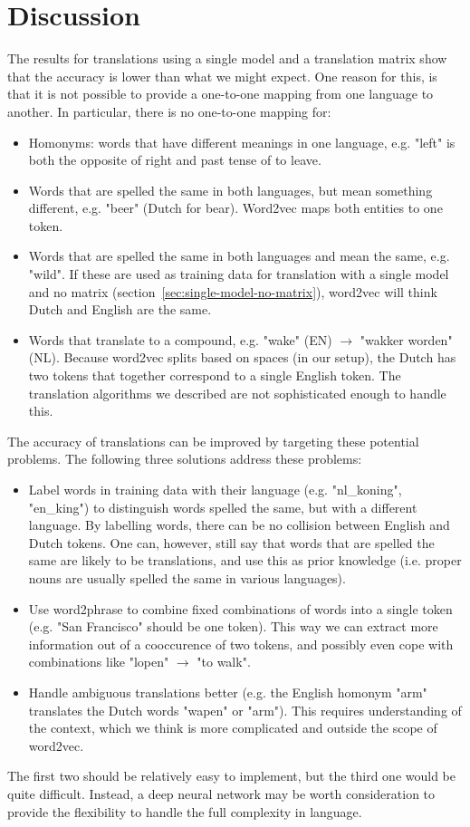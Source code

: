 \section{Discussion}
\label{sec:discussion}
The results for translations using a single model and a translation matrix show that the accuracy is lower than what we might expect. One reason for this, is that it is not possible to provide a one-to-one mapping from one language to another. In particular, there is no one-to-one mapping for:
\begin{itemize}
\item Homonyms: words that have different meanings in one language, e.g. "left" is both the opposite of right and past tense of to leave.
\item Words that are spelled the same in both languages, but mean something different, e.g. "beer" (Dutch for bear). Word2vec maps both entities to one token.
\item Words that are spelled the same in both languages and mean the same, e.g. "wild". If these are used as training data for translation with a single model and no matrix (section~\ref{sec:single-model-no-matrix}), word2vec will think Dutch and English are the same.
\item Words that translate to a compound, e.g. "wake" (EN) $\to$ "wakker worden" (NL). Because word2vec splits based on spaces (in our setup), the Dutch has two tokens that together correspond to a single English token. The translation algorithms we described are not sophisticated enough to handle this.
\end{itemize}

The accuracy of translations can be improved by targeting these potential problems. The following three solutions address these problems:

\begin{itemize}
\item Label words in training data with their language (e.g. "nl\_koning", "en\_king") to distinguish words spelled the same, but with a different language. By labelling words, there can be no collision between English and Dutch tokens. One can, however, still say that words that are spelled the same are likely to be translations, and use this as prior knowledge (i.e. proper nouns are usually spelled the same in various languages).
\item Use word2phrase to combine fixed combinations of words into a single token (e.g. "San Francisco" should be one token). This way we can extract more information out of a cooccurence of two tokens, and possibly even cope with combinations like "lopen" $\to$ "to walk".
\item Handle ambiguous translations better (e.g. the English homonym "arm" translates the Dutch words "wapen" or "arm"). This requires understanding of the context, which we think is more complicated and outside the scope of word2vec.
\end{itemize}

The first two should be relatively easy to implement, but the third one would be quite difficult. Instead, a deep neural network may be worth consideration to provide the flexibility to handle the full complexity in language.